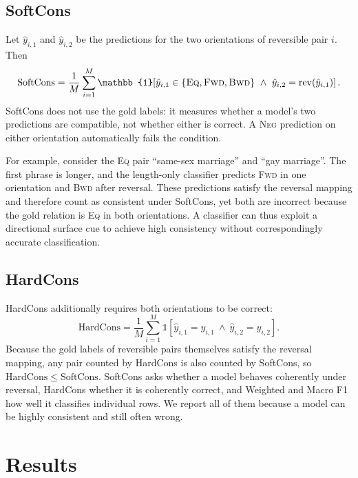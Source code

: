 \documentclass[11pt,a4paper]{article}
\newcommand{\EQ}{\textsc{Eq}}
\newcommand{\FWD}{\textsc{Fwd}}
\newcommand{\BWD}{\textsc{Bwd}}
\newcommand{\NEG}{\textsc{Neg}}
\DeclareMathOperator{\rev}{rev}
\begin{document}
\subsection{SoftCons}
Let $\hat y_{i,1}$ and $\hat y_{i,2}$ be the predictions for the two orientations of reversible pair $i$. Then
\begin{equation}
\mathrm{SoftCons}=\frac{1}{M}\sum_{i=1}^{M}\mathbb{1}\!\left[\hat y_{i,1}\in\{\EQ,\FWD,\BWD\}\ \wedge\ \hat y_{i,2}=\rev(\hat y_{i,1})\right].
\end{equation}
SoftCons does not use the gold labels: it measures whether a model's two predictions are compatible, not whether either is correct. A \NEG{} prediction on either orientation automatically fails the condition.

For example, consider the \EQ{} pair ``same-sex marriage'' and ``gay marriage''. The first phrase is longer, and the length-only classifier predicts \FWD{} in one orientation and \BWD{} after reversal. These predictions satisfy the reversal mapping and therefore count as consistent under SoftCons, yet both are incorrect because the gold relation is \EQ{} in both orientations. A classifier can thus exploit a directional surface cue to achieve high consistency without correspondingly accurate classification.

\subsection{HardCons}
HardCons additionally requires both orientations to be correct:
\begin{equation}
\mathrm{HardCons}=\frac{1}{M}\sum_{i=1}^{M}\mathbb{1}\!\left[\hat y_{i,1}=y_{i,1}\ \wedge\ \hat y_{i,2}=y_{i,2}\right].
\end{equation}
Because the gold labels of reversible pairs themselves satisfy the reversal mapping, any pair counted by HardCons is also counted by SoftCons, so $\mathrm{HardCons}\le\mathrm{SoftCons}$. SoftCons asks whether a model behaves coherently under reversal, HardCons whether it is coherently correct, and Weighted and Macro F1 how well it classifies individual rows. We report all of them because a model can be highly consistent and still often wrong.

\section{Results}
\label{sec:results}
\end{document}
